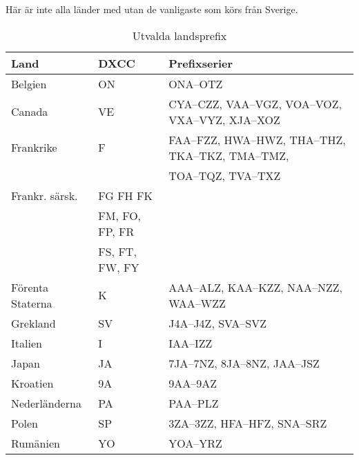 Här är inte alla länder med utan de vanligaste som körs från Sverige.

\begin{center}
  \begin{footnotesize}
    \begin{longtable}{lll}
      \caption{Utvalda landsprefix}                                                                               \\
      \textbf{Land}                          & \textbf{DXCC}  & \textbf{Prefixserier}                             \\ \hline
			Belgien              & ON             & ONA--OTZ                                          \\
			Canada               & VE             & CYA--CZZ, VAA--VGZ, VOA--VOZ, VXA--VYZ, XJA--XOZ  \\
			Frankrike            & F              & FAA--FZZ, HWA--HWZ, THA--THZ, TKA--TKZ, TMA--TMZ, \\
			                     &                & TOA--TQZ, TVA--TXZ                                \\
			Frankr. särsk.       & FG FH FK       &                                                   \\
			                     & FM, FO, FP, FR &                                                   \\
			                     & FS, FT, FW, FY &                                                   \\
			Förenta Staterna     & K              & AAA--ALZ, KAA--KZZ, NAA--NZZ, WAA--WZZ            \\
			Grekland             & SV             & J4A--J4Z, SVA--SVZ                                \\
			Italien              & I              & IAA--IZZ                                          \\
			Japan                & JA             & 7JA--7NZ, 8JA--8NZ, JAA--JSZ                      \\
			Kroatien             & 9A             & 9AA--9AZ                                          \\
			Nederländerna        & PA             & PAA--PLZ                                          \\
			Polen                & SP             & 3ZA--3ZZ, HFA--HFZ, SNA--SRZ                      \\
			Rumänien             & YO             & YOA--YRZ                                          \\

\end{longtable}
\end{footnotesize}
\end{center}

